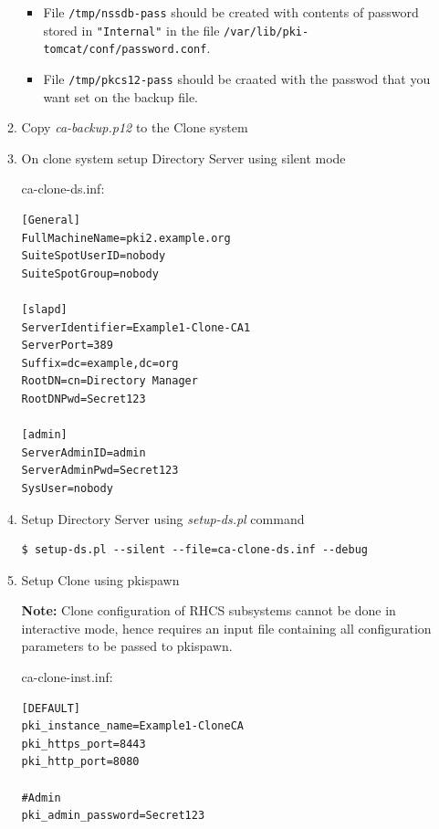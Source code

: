 \documentclass[12pt]{report}
\begin{document}
\begin{enumerate}[label*=\arabic*.]
\begin{enumerate}[label*=\arabic*.]
\begin{itemize}
                            \item File \texttt{/tmp/nssdb-pass} should be created with contents of password stored in
                        \texttt{"Internal"} in the file \texttt{/var/lib/pki-tomcat/conf/password.conf}. 
                            \item File \texttt{/tmp/pkcs12-pass} should be craated with the passwod that you want set on
                                the backup file. 
                        \end{itemize}
                    \item Copy \textit{ca-backup.p12} to the Clone system
                    \item On clone system setup Directory Server using silent mode

ca-clone-ds.inf:                         
                        \begin{lstlisting}[style=configFile]
[General]
FullMachineName=pki2.example.org
SuiteSpotUserID=nobody
SuiteSpotGroup=nobody

[slapd]
ServerIdentifier=Example1-Clone-CA1
ServerPort=389
Suffix=dc=example,dc=org
RootDN=cn=Directory Manager
RootDNPwd=Secret123

[admin]
ServerAdminID=admin
ServerAdminPwd=Secret123
SysUser=nobody                       
                        \end{lstlisting}
                    \item Setup Directory Server using \textit{setup-ds.pl} command
                        \begin{lstlisting}[style=bashInputStyle]
$ setup-ds.pl --silent --file=ca-clone-ds.inf --debug                    
                        \end{lstlisting}

                    \item Setup Clone using pkispawn
                    
                    \textbf{Note:} Clone configuration of RHCS subsystems cannot be done in interactive mode, hence requires
                    an input file containing all configuration parameters to be passed to pkispawn.

ca-clone-inst.inf:                    
                    \begin{lstlisting}[style=configFile]
[DEFAULT]
pki_instance_name=Example1-CloneCA
pki_https_port=8443
pki_http_port=8080

#Admin
pki_admin_password=Secret123


\end{lstlisting}
\end{enumerate}
\end{enumerate}
\end{document}
